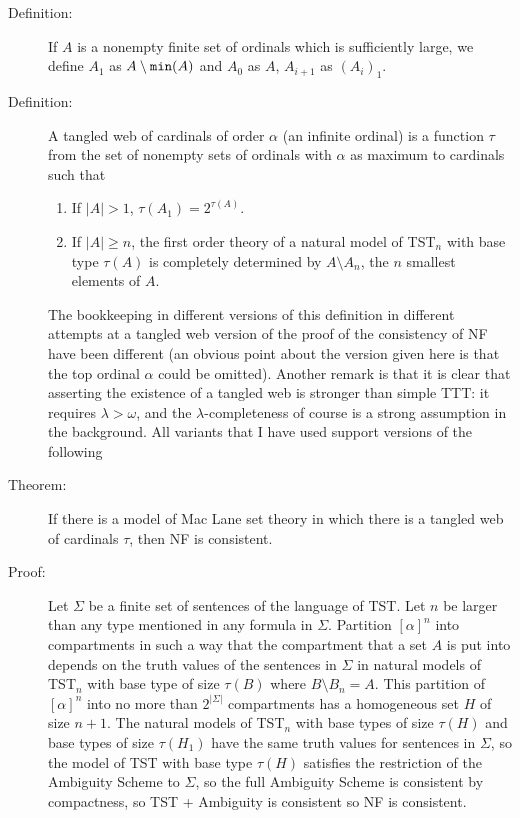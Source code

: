 \documentclass[112pt]{article}
\begin{document}
\begin{description}

\item[Definition:]  If $A$ is a nonempty finite set of ordinals which is sufficiently large, we define $A_1$ as $A \setminus {\tt min}(A)$ and $A_0$ as $A$, $A_{i+1}$ as $(A_i)_1$.

\item[Definition:]  A tangled web of cardinals of order $\alpha$ (an infinite ordinal) is a function $\tau$ from the set of nonempty sets of ordinals with $\alpha$ as maximum
to cardinals such that

\begin{enumerate}

\item  If $|A|>1$, $\tau(A_1) = 2^{\tau(A)}$.

\item  If $|A|\geq n$, the first order theory of a natural model of TST$_n$ with base type $\tau(A)$ is completely determined by $A \setminus A_n$, the
$n$ smallest elements of $A$.

\end{enumerate}

The bookkeeping in different versions of this definition in different attempts at a tangled web version of the proof of the consistency of NF have been different (an obvious point about the version given here is that the top ordinal $\alpha$ could be omitted).  Another remark is that it is clear that asserting the existence of a tangled web is stronger than simple TTT:  it requires $\lambda>\omega$, and the $\lambda$-completeness of course is a strong assumption in the background.  All variants that I have used support versions of the following

\item[Theorem:]  If there is a model of Mac Lane set theory in which there is a tangled web of cardinals $\tau$, then NF is consistent.

\item[Proof:]  Let $\Sigma$ be a finite set of sentences of the language of TST.  Let $n$ be larger than any type mentioned in any formula in $\Sigma$.
Partition $[\alpha]^n$ into compartments in such a way that the compartment that a set $A$ is put into depends on the truth values of the sentences in $\Sigma$ in natural models of TST$_n$  with base type of size $\tau(B)$ where $B \setminus B_n=A$.  This partition of $[\alpha]^n$ into no more than
$2^{|\Sigma|}$ compartments has a homogeneous set $H$ of size $n+1$.  The natural models of TST$_n$ with base types of size $\tau(H)$ and base
types of size $\tau(H_1)$ have the same truth values for sentences in $\Sigma$, so the model of TST with base type $\tau(H)$ satisfies the restriction of the Ambiguity Scheme to $\Sigma$, so the full Ambiguity Scheme is consistent by compactness, so TST + Ambiguity is consistent so NF is consistent.


\end{description}
\end{document}
